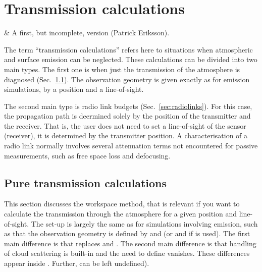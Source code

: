 \chapter{Transmission calculations}
 \label{sec:trans}


 & A first, but incomplete, version (Patrick Eriksson).\\
\stophistory

The term ``transmission calculations'' refers here to situations when
atmospheric and surface emission can be neglected. These calculations can be
divided into two main types. The first one is when just the transmission of the
atmosphere is diagnosed (Sec.~\ref{sec:transmission}). The observation geometry
is given exactly as for emission simulations, by a position and a
line-of-sight.

The second main type is radio link budgets (Sec.~\ref{sec:radiolinks}). For
this case, the propagation path is deermined solely by the position of the
transmitter and the receiver. That is, the user does not need to set a
line-of-sight of the sensor (receiver), it is determined by the transmitter
position. A characterisation of a radio link normally involves several
attenuation terms not encountered for passive measurements, such as free space
loss and defocusing.




\section{Pure transmission calculations}
\label{sec:transmission}

This section discusses the  workspace method,
that is relevant if you want to calculate the transmission through the
atmosphere for a given position and line-of-sight. The set-up is largely the
same as for simulations involving emission, such as that the observation
geometry is defined by  and  (or
 and  if  is used).
The first main difference is that  replaces
 and . The second
main difference is that handling of cloud scattering is built-in and the need
to define  vanishes. These differences appear
inside . Further,
 can be left undefined).


